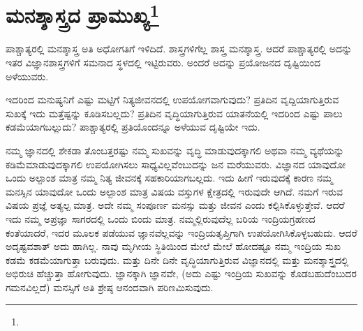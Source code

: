 
\chapter[ಮನಶ್ಶಾಸ್ತ್ರದ ಪ್ರಾಮುಖ್ಯ]{ಮನಶ್ಶಾಸ್ತ್ರದ ಪ್ರಾಮುಖ್ಯ\protect\footnote{}}

ಪಾಶ್ಚಾತ್ಯರಲ್ಲಿ ಮನಶ್ಶಾಸ್ತ್ರ ಅತಿ ಅಧೋಗತಿಗೆ ಇಳಿದಿದೆ. ಶಾಸ್ತ್ರಗಳಿಗೆಲ್ಲ ಶಾಸ್ತ್ರ ಮನಶ್ಶಾಸ್ತ್ರ. ಆದರೆ ಪಾಶ್ಚಾತ್ಯರಲ್ಲಿ ಅದನ್ನು ಇತರ ವಿಜ್ಞಾನಶಾಸ್ತ್ರಗಳಿಗೆ ಸಮನಾದ ಸ್ಥಳದಲ್ಲಿ ಇಟ್ಟಿರುವರು. ಅಂದರೆ ಅದನ್ನು ಪ್ರಯೋಜನದ ದೃಷ್ಟಿಯಿಂದ ಅಳೆಯುವರು.

ಇದರಿಂದ ಮನುಷ್ಯನಿಗೆ ಎಷ್ಟು ಮಟ್ಟಿಗೆ ನಿತ್ಯಜೀವನದಲ್ಲಿ ಉಪಯೋಗವಾಗುವುದು? ಪ್ರತಿದಿನ ವೃದ್ದಿಯಾಗುತ್ತಿರುವ ಸುಖಕ್ಕೆ ಇದು ಮತ್ತೆಷ್ಟನ್ನು ಕೂಡಿಸಬಲ್ಲದು? ಪ್ರತಿದಿನ ವೃದ್ಧಿಯಾಗುತ್ತಿರುವ ಯಾತನೆಯಲ್ಲಿ ಇದರಿಂದ ಎಷ್ಟು ಪಾಲು ಕಡಮೆಯಾಗಬಲ್ಲುದು? ಪಾಶ್ಚಾತ್ಯರಲ್ಲಿ ಪ್ರತಿಯೊಂದನ್ನೂ ಅಳೆಯುವ ದೃಷ್ಟಿಯೇ ಇದು.

ನಮ್ಮ ಜ್ಞಾನದಲ್ಲಿ ಶೇಕಡಾ ತೊಂಬತ್ತರಷ್ಟು ನಮ್ಮ ಸುಖವನ್ನು ವೃದ್ಧಿ ಮಾಡುವುದಕ್ಕಾಗಲಿ ಅಥವಾ ನಮ್ಮ ವ್ಯಥೆಯನ್ನು ಕಡಿಮೆಮಾಡುವುದಕ್ಕಾಗಲಿ ಉಪಯೋಗಿಸಲು ಸಾಧ್ಯವಿಲ್ಲವೆಂಬುದನ್ನು ಜನ ಮರೆಯುವರು. ವಿಜ್ಞಾನದ ಯಾವುದೋ ಒಂದು ಅಲ್ಪಾಂಶ ಮಾತ್ರ ನಮ್ಮ ನಿತ್ಯ ಜೀವನಕ್ಕೆ ಸಹಕಾರಿಯಾಗಬಲ್ಲದು. ಇದು ಹೀಗೆ ಇರುವುದಕ್ಕೆ ಕಾರಣ ನಮ್ಮ ಮನಸ್ಸಿನ ಯಾವುದೋ ಒಂದು ಅಲ್ಪಾಂಶ ಮಾತ್ರ ವಿಷಯ ವಸ್ತುಗಳ ಕ್ಷೇತ್ರದಲ್ಲಿ ಇರುವುದೇ ಆಗಿದೆ. ನಮಗೆ ಇರುವ ವಿಷಯ ಪ್ರಜ್ಞೆ ಅತ್ಯಲ್ಪ ಮಾತ್ರ. ಅದೇ ನಮ್ಮ ಸಂಪೂರ್ಣ ಮನಸ್ಸು ಮತ್ತು ಜೀವನ ಎಂದು ಕಲ್ಪಿಸಿಕೊಳ್ಳುತ್ತೇವೆ. ಆದರೆ ಇದು ನಮ್ಮ ಅಪ್ರಜ್ಞಾ ಸಾಗರದಲ್ಲಿ ಒಂದು ಬಿಂದು ಮಾತ್ರ. ನಮ್ಮಲ್ಲಿರುವುದೆಲ್ಲ ಬರಿಯ ಇಂದ್ರಿಯಗ್ರಹಣದ ಕಂತೆಯಾದರೆ, ಇದರ ಮೂಲಕ ಪಡೆಯುವ ಜ್ಞಾನವೆಲ್ಲವನ್ನು ಇಂದ್ರಿಯತೃಪ್ತಿಗಾಗಿ ಉಪಯೋಗಿಸಿಕೊಳ್ಳಬಹುದು. ಆದರೆ ಅದೃಷ್ಟವಶಾತ್ ಅದು ಹಾಗಿಲ್ಲ. ನಾವು ಮೃಗೀಯ ಸ್ಥಿತಿಯಿಂದ ಮೇಲೆ ಮೇಲೆ ಹೋದಷ್ಟೂ ನಮ್ಮ ಇಂದ್ರಿಯ ಸುಖ ಕಡಮೆ ಕಡಮೆಯಾಗುತ್ತಾ ಬರುವುದು. ಮತ್ತು ದಿನೇ ದಿನೇ ವೃದ್ಧಿಯಾಗುತ್ತಿರುವ ವಿಜ್ಞಾನದಲ್ಲಿ ಮತ್ತು ಮನಶ್ಶಾಸ್ತ್ರದಲ್ಲಿ ಅಭಿರುಚಿ ಹೆಚ್ಚುತ್ತಾ ಹೋಗುವುದು. ಜ್ಞಾನಕ್ಕಾಗಿ ಜ್ಞಾನವೇ, (ಅದು ಎಷ್ಟು ಇಂದ್ರಿಯ ಸುಖವನ್ನು ಕೊಡಬಹುದೆಂಬುದರ ಗಮನವಿಲ್ಲದೆ) ಮನಸ್ಸಿಗೆ ಅತಿ ಶ್ರೇಷ್ಠ ಆನಂದವಾಗಿ ಪರಿಣಮಿಸುವುದು.

